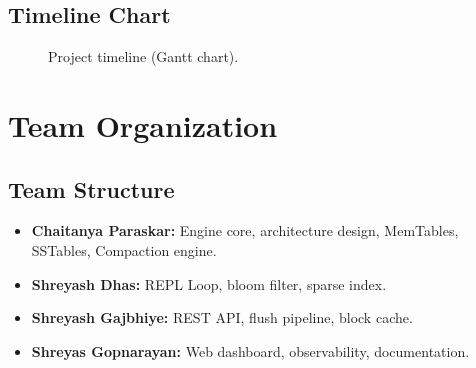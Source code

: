 \documentclass[oneside,a4paper,12pt]{book}
\begin{document}
\subsection{Timeline Chart}

\begin{figure}[H]
  \caption{Project timeline (Gantt chart).}
  \label{fig:gantt}
\end{figure}

\section{Team Organization}

\subsection{Team Structure}
\begin{itemize}[leftmargin=2em]
    \item \textbf{Chaitanya Paraskar:} Engine core, architecture design, MemTables, SSTables, Compaction engine.
    \item \textbf{Shreyash Dhas:} REPL Loop, bloom filter, sparse index.
    \item \textbf{Shreyash Gajbhiye:} REST API, flush pipeline, block cache.
    \item \textbf{Shreyas Gopnarayan:} Web dashboard, observability, documentation.
\end{itemize}
\end{document}
